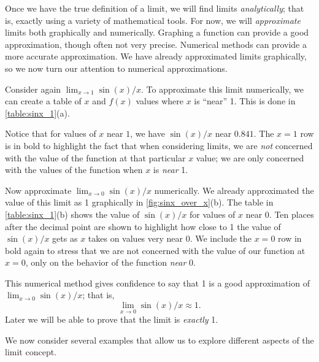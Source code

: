 Once we have the true definition of a limit, we will find limits \textit{analytically}; that is, exactly using a variety of mathematical tools. For now, we will \textit{approximate} limits both graphically and numerically. Graphing a function can provide a good approximation, though often not very precise. Numerical methods can provide a more accurate approximation. We have already approximated limits graphically, so we now turn our attention to numerical approximations.

Consider again $\lim_{x\to 1}\sin (x)/x$. To approximate this limit numerically, we can create a table of $x$ and $f(x)$ values where $x$ is ``near'' 1. This is done in \autoref{table:sinx_1}(a).

Notice that for values of $x$ near $1$, we have $\sin (x)/x$ near $0.841$. The $x=1$ row is in bold to highlight the fact that when considering limits, we are \textit{not} concerned with the value of the function at that particular $x$ value; we are only concerned with the values of the function when $x$ is \textit{near} 1. 

Now approximate $\lim_{x\to 0} \sin(x)/x$ numerically. We already approximated the value of this limit as 1 graphically in \autoref{fig:sinx_over_x}(b). The table in \autoref{table:sinx_1}(b) shows the value of $\sin(x)/x$ for values of $x$ near 0. Ten places after the decimal point are shown to highlight how close to 1 the value of $\sin(x)/x$ gets as $x$ takes on values very near 0. We include the $x=0$ row in bold again to stress that we are not concerned with the value of our function at $x=0$, only on the behavior of the function \textit{near} 0. 

This numerical method gives confidence to say that 1 is a good approximation of $\lim_{x\to 0} \sin(x)/x$; that is,
\[\lim_{x\to 0} \sin(x)/x \approx 1.\]
Later we will be able to prove that the limit is \textit{exactly} 1.


We now consider several examples that allow us to explore different aspects of the limit concept.


